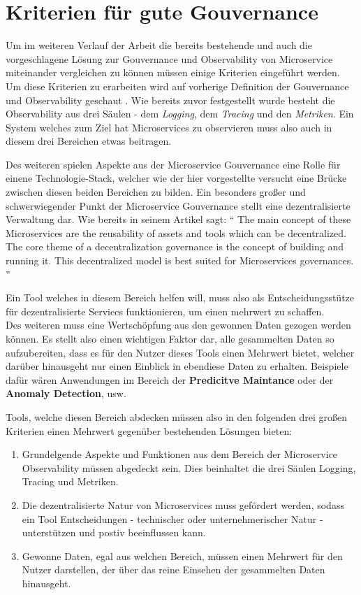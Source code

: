 \documentclass[
	12pt,
	BCOR=5mm,
	DIV=12,
	headinclude=on,
	footinclude=off,
	parskip=half,
	bibliography=totoc,
	listof=entryprefix,
	toc=listof,
	numbers=noenddot,
	plainfootsepline
]{scrreprt}
\begin{document}
\section{Kriterien für gute Gouvernance}

Um im weiteren Verlauf der Arbeit die bereits bestehende und auch die vorgeschlagene Lösung zur Gouvernance und Observability von Microservice miteinander vergleichen zu können müssen einige Kriterien eingeführt werden. Um diese Kriterien zu erarbeiten wird auf vorherige Definition der Gouvernance und Observability geschaut . Wie bereits zuvor festgestellt wurde besteht die Observability aus drei Säulen - dem \textit{Logging}, dem \textit{Tracing} und den \textit{Metriken}. Ein System welches zum Ziel hat Microservices zu observieren muss also auch in diesem drei Bereichen etwas beitragen. 

Des weiteren spielen Aspekte aus der Microservice Gouvernance eine Rolle für einene Technologie-Stack, welcher wie der hier vorgestellte versucht eine Brücke zwischen diesen beiden Bereichen zu bilden. Ein besonders großer und schwerwiegender Punkt der Microservice Gouvernance stellt eine dezentralisierte Verwaltung dar. Wie bereits \citeauthor{LeanixGouv} in seinem Artikel sagt:
\enquote{
	The main concept of these Microservices are the reusability of assets and tools which can be decentralized. The core theme of a decentralization governance is the concept of building and running it. This decentralized model is best suited for Microservices governances.
}\autocite{LeanixGouv}

Ein Tool welches in diesem Bereich helfen will, muss also als Entscheidungsstütze für dezentralisierte Serviecs funktionieren, um einen mehrwert zu schaffen. \\
Des weiteren muss eine Wertschöpfung aus den gewonnen Daten gezogen werden können. Es stellt also einen wichtigen Faktor dar, alle gesammelten Daten so aufzubereiten, dass es für den Nutzer dieses Tools einen Mehrwert bietet, welcher darüber hinausgeht nur einen Einblick in ebendiese Daten zu erhalten. Beispiele dafür wären Anwendungen im Bereich der \textbf{Predicitve Maintance} oder der \textbf{Anomaly Detection}, usw.

Tools, welche diesen Bereich abdecken müssen also in den folgenden drei großen Kriterien einen Mehrwert gegenüber bestehenden Lösungen bieten:

\begin{enumerate}
	\item Grundelgende Aspekte und Funktionen aus dem Bereich der Microservice Observability müssen abgedeckt sein. Dies beinhaltet die drei Säulen Logging, Tracing und Metriken.
	\item Die dezentralisierte Natur von Microservices muss gefördert werden, sodass ein Tool Entscheidungen - technischer oder unternehmerischer Natur - unterstützen und postiv beeinflussen kann.
	\item Gewonne Daten, egal aus welchen Bereich, müssen einen Mehrwert für den Nutzer darstellen, der über das reine Einsehen der gesammelten Daten hinausgeht.
\end{enumerate}
\end{document}
